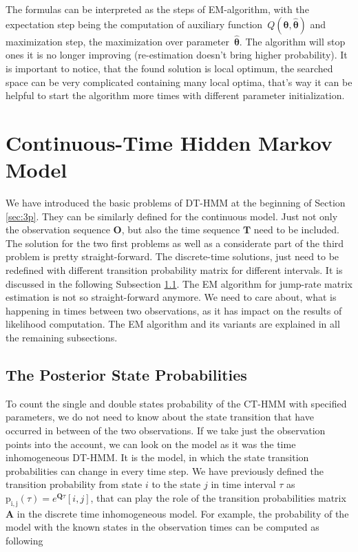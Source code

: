 \documentclass[thesis=M,english]{FITthesis}[2012/10/20]
\newcommand{\matr}[1]{\mathbf{#1}}
\begin{document}
The formulas can be interpreted as the steps of EM-algorithm, with the expectation step being the computation of auxiliary function~$Q(\boldsymbol{\theta},\boldsymbol{\hat{\theta}})$ and maximization step, the maximization over parameter~$\boldsymbol{\hat{\theta}}$. The algorithm will stop ones it is no longer improving (re-estimation doesn't bring higher probability). It is important to notice, that the found solution is local optimum, the searched space can be very complicated containing many local optima, that's way it can be helpful to start the algorithm more times with different parameter initialization.  


\section{Continuous-Time Hidden Markov Model}

We have introduced the basic problems of DT-HMM at the beginning of Section \ref{sec:3p}. They can be similarly defined for the continuous model. Just not only the observation sequence $\matr{O}$, but also the time sequence $\matr{T}$ need to be included. The solution for the two first problems as well as a considerate part of the third problem is pretty straight-forward. The discrete-time solutions, just need to be redefined with different transition probability matrix for different intervals. It is discussed in the following Subsection \ref{sec:pos}. The EM algorithm for jump-rate matrix estimation is not so straight-forward anymore. We need to care about, what is happening in times between two observations, as it has impact on the results of likelihood computation. The EM algorithm and its variants are explained in all the remaining subsections.   


\subsection{The Posterior State Probabilities}\label{sec:pos}

To count the single and double states probability of the CT-HMM with specified parameters, we do not need to know about the state transition that have occurred in between of the two observations.
If we take just the observation points into the account, we can look on the model as it was the time inhomogeneous DT-HMM. It is the model, in which the state transition probabilities can change in every time step. We have previously defined the transition probability from state $i$ to the state $j$ in time interval $\tau$ as $\mathrm{p_{i,j}}( \tau ) = e^{ \matr{Q} \tau}[i,j]$, that can play the role of the transition probabilities matrix $\matr{A}$ in the discrete time inhomogeneous model. For example, the probability of the model with the known states in the observation times can be computed as following
\end{document}
